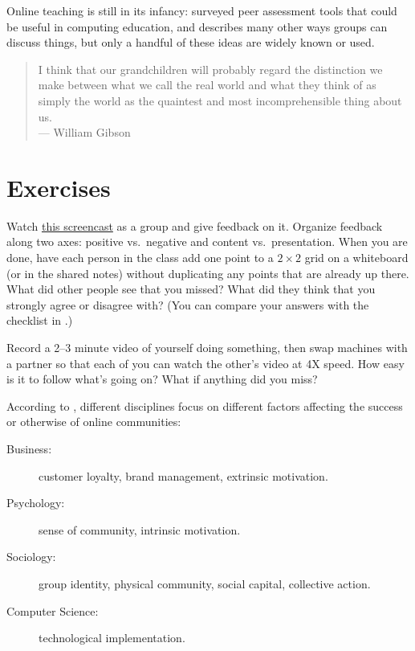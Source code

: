 Online teaching is still in its infancy: \cite{Luxt2009} surveyed peer
assessment tools that could be useful in computing education, and
\cite{Broo2016} describes many other ways groups can discuss things,
but only a handful of these ideas are widely known or used.

\begin{quote}

  I think that our grandchildren will probably regard the distinction
  we make between what we call the real world and what they think of
  as simply the world as the quaintest and most incomprehensible thing
  about us. \\
  --- William Gibson

\end{quote}

\section{Exercises}\label{s:online-exercises}


Watch \href{https://youtu.be/xcnoHaxXvdQ}{this screencast} as a group
and give feedback on it. Organize feedback along two axes: positive
vs.\ negative and content vs.~presentation.  When you are done, have
each person in the class add one point to a $2{\times}2$ grid on a
whiteboard (or in the shared notes) without duplicating any points
that are already up there.  What did other people see that you missed?
What did they think that you strongly agree or disagree with?  (You
can compare your answers with the checklist in .)


Record a 2--3 minute video of yourself doing something, then swap
machines with a partner so that each of you can watch the other's
video at 4X speed.  How easy is it to follow what's going on?  What if
anything did you miss?


According to \cite{Irib2009}, different disciplines focus on different
factors affecting the success or otherwise of online communities:

\begin{description}

  \item[Business:] customer loyalty, brand management, extrinsic
    motivation.

  \item[Psychology:] sense of community, intrinsic motivation.

  \item[Sociology:] group identity, physical community, social
    capital, collective action.

  \item[Computer Science:] technological implementation.

\end{description}

